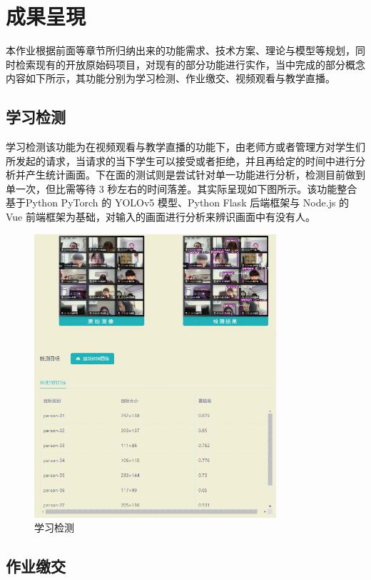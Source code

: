 \chapter{成果呈現}
\label{chap:4}

本作业根据前面等章节所归纳出来的功能需求、技术方案、理论与模型等规划，同时检索现有的开放原始码项目，对现有的部分功能进行实作，当中完成的部分概念内容如下所示，其功能分别为学习检测、作业缴交、视频观看与教学直播。

\section{学习检测}

学习检测该功能为在视频观看与教学直播的功能下，由老师方或者管理方对学生们所发起的请求，当请求的当下学生可以接受或者拒绝，并且再给定的时间中进行分析并产生统计画面。下在面的测试则是尝试针对单一功能进行分析，检测目前做到单一次，但比需等待 3 秒左右的时间落差。其实际呈现如下图所示。该功能整合基于Python PyTorch 的 YOLOv5 模型、Python Flask 后端框架与 Node.js 的 Vue 前端框架为基础，对输入的画面进行分析来辨识画面中有没有人。

\begin{figure}[htb]
\centering 
\includegraphics[width=0.80\textwidth]{img/ch4m1.png} 
\caption{学习检测}
\label{Test}
\end{figure}

\section{作业缴交}


